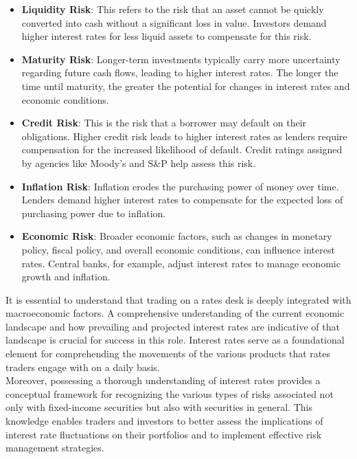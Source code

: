 \documentclass{article}
\begin{document}
\begin{itemize}
    \item \textbf{Liquidity Risk}: This refers to the risk that an asset cannot be quickly converted into cash without a significant loss in value. Investors demand higher interest rates for less liquid assets to compensate for this risk.
    
    \item \textbf{Maturity Risk}: Longer-term investments typically carry more uncertainty regarding future cash flows, leading to higher interest rates. The longer the time until maturity, the greater the potential for changes in interest rates and economic conditions.
    
    \item \textbf{Credit Risk}: This is the risk that a borrower may default on their obligations. Higher credit risk leads to higher interest rates as lenders require compensation for the increased likelihood of default. Credit ratings assigned by agencies like Moody's and S\&P help assess this risk.
    
    \item \textbf{Inflation Risk}: Inflation erodes the purchasing power of money over time. Lenders demand higher interest rates to compensate for the expected loss of purchasing power due to inflation.
    
    \item \textbf{Economic Risk}: Broader economic factors, such as changes in monetary policy, fiscal policy, and overall economic conditions, can influence interest rates. Central banks, for example, adjust interest rates to manage economic growth and inflation.


\end{itemize}


\newpage

It is essential to understand that trading on a rates desk is deeply integrated with macroeconomic factors. A comprehensive understanding of the current economic landscape and how prevailing and projected interest rates are indicative of that landscape is crucial for success in this role. Interest rates serve as a foundational element for comprehending the movements of the various products that rates traders engage with on a daily basis.\\


Moreover, possessing a thorough understanding of interest rates provides a conceptual framework for recognizing the various types of risks associated not only with fixed-income securities but also with securities in general. This knowledge enables traders and investors to better assess the implications of interest rate fluctuations on their portfolios and to implement effective risk management strategies.\\
\end{document}
